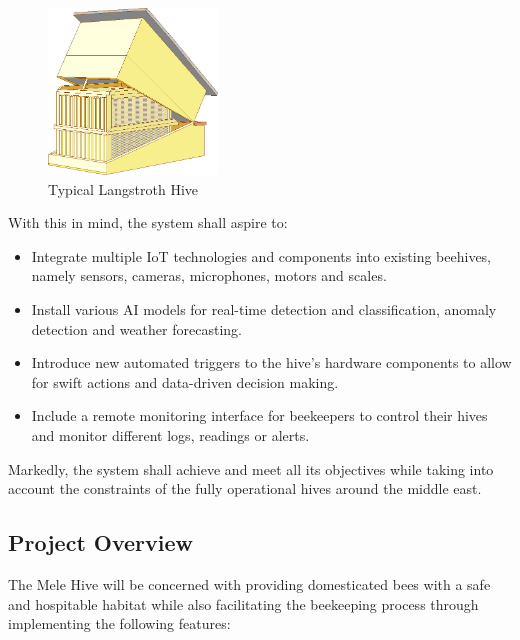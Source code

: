 \documentclass[12pt]{article}
\begin{document}
	\begin{figure}[H]
		\centering
		\includegraphics[width=0.4\textwidth]{Images/hive.jpg}
		\caption{Typical Langstroth Hive \cite{CushmanBeeLang}}
		\label{fig:LANGSTROTH_HIVE}
	\end{figure}
	
	\hspace{-0.5 cm}With this in mind, the system shall aspire to:
	\begin{itemize}
		\item Integrate multiple IoT technologies and components into existing beehives, namely sensors, cameras, microphones, motors and scales.
		
		\item Install various AI models for real-time detection and classification, anomaly detection and weather forecasting.
		
		\item Introduce new automated triggers to the hive’s hardware components to allow for swift actions and data-driven decision making.
		
		\item Include a remote monitoring interface for beekeepers to control their hives and monitor different logs, readings or alerts.
	\end{itemize} 
	Markedly, the system shall achieve and meet all its objectives while taking into account the constraints of the fully operational hives around the middle east.
	
	\subsection{Project Overview}
	
	
	The Mele Hive will be concerned with providing domesticated bees with a safe and hospitable habitat while also facilitating the beekeeping process through implementing the following features:
	
\end{document}
